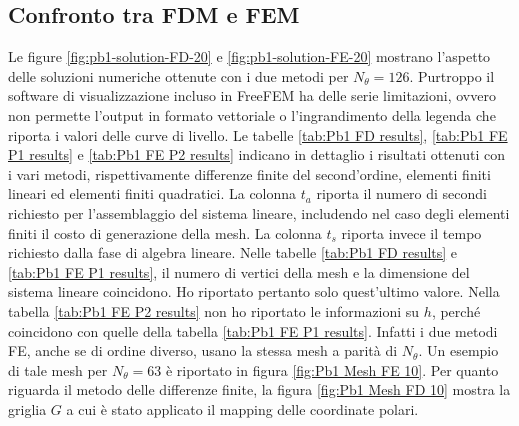 \documentclass[a4paper]{article}
\begin{document}
\subsection{Confronto tra FDM e FEM}
Le figure \ref{fig:pb1-solution-FD-20} e \ref{fig:pb1-solution-FE-20} mostrano
l'aspetto delle soluzioni numeriche ottenute con i due metodi per $N_\theta = 126$.
Purtroppo il software di visualizzazione incluso in FreeFEM ha delle serie limitazioni,
ovvero non permette l'output in formato vettoriale
o l'ingrandimento della legenda che riporta i valori delle curve di livello.
Le tabelle \ref{tab:Pb1 FD results}, \ref{tab:Pb1 FE P1 results}
e \ref{tab:Pb1 FE P2 results} indicano in dettaglio i risultati ottenuti con i
vari metodi, rispettivamente differenze finite del second'ordine,
elementi finiti lineari ed elementi finiti quadratici.
La colonna $t_a$ riporta il numero di secondi richiesto per l'assemblaggio
del sistema lineare, includendo nel caso degli elementi finiti il costo
di generazione della mesh. La colonna $t_s$ riporta invece il tempo
richiesto dalla fase di algebra lineare.
Nelle tabelle \ref{tab:Pb1 FD results} e \ref{tab:Pb1 FE P1 results}, il numero di
vertici della mesh e la dimensione del sistema lineare coincidono.
Ho riportato pertanto solo quest'ultimo valore.
Nella tabella \ref{tab:Pb1 FE P2 results} non ho riportato le informazioni
su $h$, perché coincidono con quelle della tabella \ref{tab:Pb1 FE P1 results}.
Infatti i due metodi FE, anche se di ordine diverso, usano la stessa mesh
a parità di $N_\theta$. Un esempio di tale mesh per $N_\theta = 63$
è riportato in figura \ref{fig:Pb1 Mesh FE 10}.
Per quanto riguarda il metodo delle differenze finite,
la figura \ref{fig:Pb1 Mesh FD 10} mostra la griglia $G$ a cui
è stato applicato il mapping delle coordinate polari.
\end{document}
